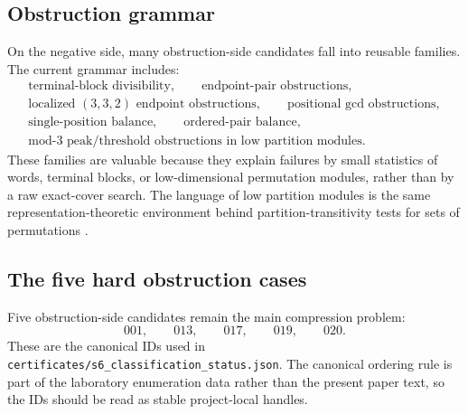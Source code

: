 \subsection*{Obstruction grammar}

On the negative side, many obstruction-side candidates fall into reusable
families.  The current grammar includes:
\[
\begin{gathered}
\text{terminal-block divisibility},\qquad
\text{endpoint-pair obstructions},\\
\text{localized }(3,3,2)\text{ endpoint obstructions},\qquad
\text{positional gcd obstructions},\\
\text{single-position balance},\qquad
\text{ordered-pair balance},\\
\text{mod-}3\text{ peak/threshold obstructions in low partition modules}.
\end{gathered}
\]
These families are valuable because they explain failures by small
statistics of words, terminal blocks, or low-dimensional permutation
modules, rather than by a raw exact-cover search.
The language of low partition modules is the same representation-theoretic
environment behind partition-transitivity tests for sets of permutations
\cite{MartinSagan2006,FangXia2026}.

\subsection*{The five hard obstruction cases}

Five obstruction-side candidates remain the main compression problem:
\[
        001,\qquad 013,\qquad 017,\qquad 019,\qquad 020.
\]
These are the canonical IDs used in
\texttt{certificates/s6\_classification\_status.json}.  The canonical
ordering rule is part of the laboratory enumeration data rather than the
present paper text, so the IDs should be read as stable project-local
handles.

